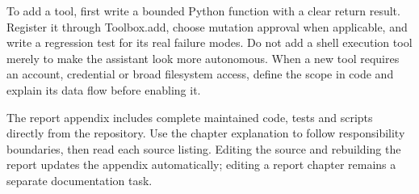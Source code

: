 To add a tool, first write a bounded Python function with a clear return result. Register it through Toolbox.add, choose mutation approval when applicable, and write a regression test for its real failure modes. Do not add a shell execution tool merely to make the assistant look more autonomous. When a new tool requires an account, credential or broad filesystem access, define the scope in code and explain its data flow before enabling it.

The report appendix includes complete maintained code, tests and scripts directly from the repository. Use the chapter explanation to follow responsibility boundaries, then read each source listing. Editing the source and rebuilding the report updates the appendix automatically; editing a report chapter remains a separate documentation task.

